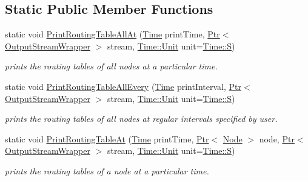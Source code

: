 \subsection*{Static Public Member Functions}
\begin{DoxyCompactItemize}
\item 
static void \hyperlink{classns3_1_1Ipv6RoutingHelper_a02468528d712df0b6358c6d7bc56b23b}{Print\+Routing\+Table\+All\+At} (\hyperlink{classns3_1_1Time}{Time} print\+Time, \hyperlink{classns3_1_1Ptr}{Ptr}$<$ \hyperlink{classns3_1_1OutputStreamWrapper}{Output\+Stream\+Wrapper} $>$ stream, \hyperlink{classns3_1_1Time_a87a7f4d29c68b047a72d291ad660295a}{Time\+::\+Unit} unit=\hyperlink{classns3_1_1Time_a87a7f4d29c68b047a72d291ad660295aade8622b06524a328cd3a59db6ccf76af}{Time\+::S})
\begin{DoxyCompactList}\small\item\em prints the routing tables of all nodes at a particular time. \end{DoxyCompactList}\item 
static void \hyperlink{classns3_1_1Ipv6RoutingHelper_a716a9e0881c5c0d1f8f3c728556a4473}{Print\+Routing\+Table\+All\+Every} (\hyperlink{classns3_1_1Time}{Time} print\+Interval, \hyperlink{classns3_1_1Ptr}{Ptr}$<$ \hyperlink{classns3_1_1OutputStreamWrapper}{Output\+Stream\+Wrapper} $>$ stream, \hyperlink{classns3_1_1Time_a87a7f4d29c68b047a72d291ad660295a}{Time\+::\+Unit} unit=\hyperlink{classns3_1_1Time_a87a7f4d29c68b047a72d291ad660295aade8622b06524a328cd3a59db6ccf76af}{Time\+::S})
\begin{DoxyCompactList}\small\item\em prints the routing tables of all nodes at regular intervals specified by user. \end{DoxyCompactList}\item 
static void \hyperlink{classns3_1_1Ipv6RoutingHelper_a4f7287245996b0bb7bdfe9d27adac329}{Print\+Routing\+Table\+At} (\hyperlink{classns3_1_1Time}{Time} print\+Time, \hyperlink{classns3_1_1Ptr}{Ptr}$<$ \hyperlink{classns3_1_1Node}{Node} $>$ node, \hyperlink{classns3_1_1Ptr}{Ptr}$<$ \hyperlink{classns3_1_1OutputStreamWrapper}{Output\+Stream\+Wrapper} $>$ stream, \hyperlink{classns3_1_1Time_a87a7f4d29c68b047a72d291ad660295a}{Time\+::\+Unit} unit=\hyperlink{classns3_1_1Time_a87a7f4d29c68b047a72d291ad660295aade8622b06524a328cd3a59db6ccf76af}{Time\+::S})
\begin{DoxyCompactList}\small\item\em prints the routing tables of a node at a particular time. \end{DoxyCompactList}\item 

\end{DoxyCompactItemize}
